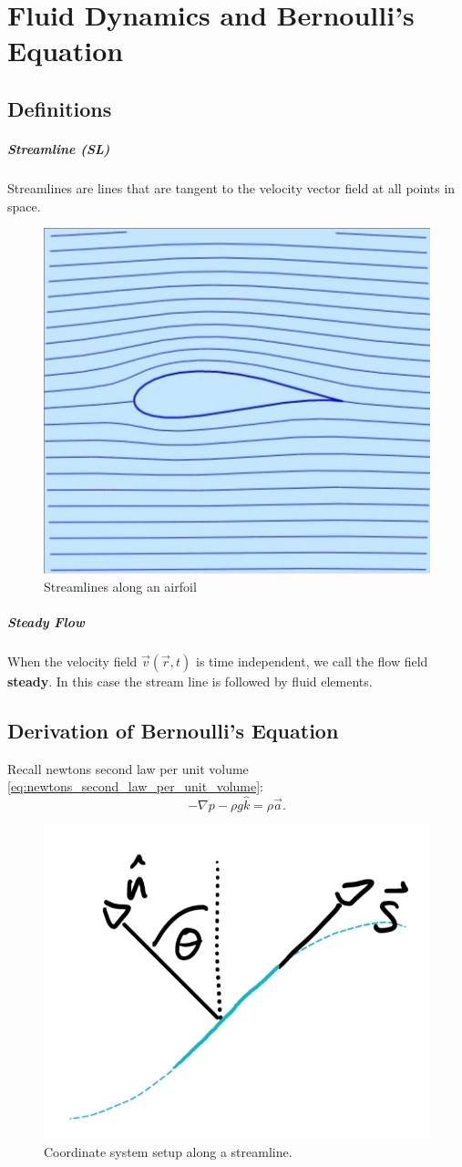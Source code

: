 \chapter{Fluid Dynamics and Bernoulli's Equation}

\section{Definitions}
\paragraph{Streamline (SL)}
Streamlines are lines that are tangent to the velocity vector field at all points in space.

\begin{figure}[H]
	\centering
	\includegraphics[width=0.3\linewidth]{Sketches/Airfoil}
	\caption{Streamlines along an airfoil}
	\label{fig:airfoil}
\end{figure}

\paragraph{Steady Flow}
When the velocity field $\vec v(\vec r, t)$ is time independent, we call the flow field \textbf{steady}. In this case the stream line is followed by fluid elements.


\section{Derivation of Bernoulli's Equation}

Recall newtons second law per unit volume \eqref{eq:newtons_second_law_per_unit_volume}:
\begin{equation*}
	-\nabla p - \rho g \hat k = \rho \vec a.
\end{equation*}

\begin{figure}[H]
	\centering
	\includegraphics[width=0.3\linewidth]{Sketches/AlongStreamline}
	\caption{Coordinate system setup along a streamline.}
	\label{fig:alongstreamline}
\end{figure}

